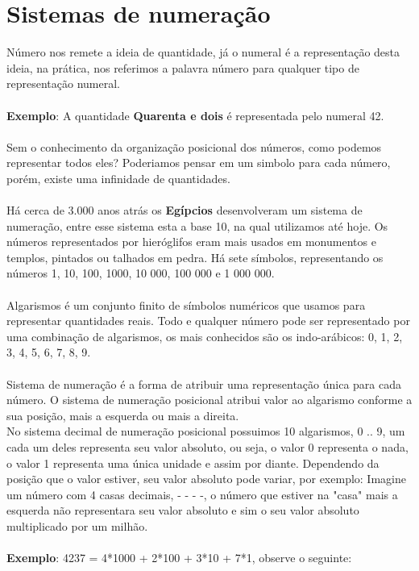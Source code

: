 \documentclass[12pt, onecolumn]{article}
\begin{document}
	\section{Sistemas de numeração}
	Número nos remete a ideia de quantidade, já o numeral é a representação desta 
	ideia, na prática, nos referimos a palavra número para qualquer tipo de
	representação numeral.\\
	\\
	\textbf{Exemplo}: A quantidade \textbf{Quarenta e dois} é representada pelo
	numeral 42.\\
	\\
	Sem o conhecimento da organização posicional dos números, como podemos
	representar todos eles? Poderiamos pensar em um simbolo para cada número,
	porém, existe uma infinidade de quantidades.\\
	\\
	Há cerca de 3.000 anos atrás os \textbf{Egípcios} desenvolveram um sistema
	de numeração, entre esse sistema esta a base 10, na qual utilizamos até hoje.
	Os números representados por hieróglifos eram mais usados em monumentos e 
	templos, pintados ou talhados em pedra. 
	Há sete símbolos, representando os números 1, 10, 100, 1000, 10 000, 
	100 000 e 1 000 000.\citep{art3}\\
	\\
	Algarismos é um conjunto finito de símbolos numéricos que usamos para
	representar quantidades reais. Todo e qualquer número pode ser representado
	por uma combinação de algarismos, os mais conhecidos são os indo-arábicos:
	0, 1, 2, 3, 4, 5, 6, 7, 8, 9.\\
	\\
	Sistema de numeração é a forma de atribuir uma representação única para cada
	número. O sistema de numeração posicional atribui valor ao algarismo conforme
	a sua posição, mais a esquerda ou mais a direita.
	\\
	No sistema decimal de numeração posicional possuimos 10 algarismos, 0 .. 9,
	um cada um deles representa seu valor absoluto, ou seja, o valor 0 representa
	o nada, o valor 1 representa uma única unidade e assim por diante. Dependendo
	da posição que o valor estiver, seu valor absoluto pode variar, por exemplo:
	Imagine um número com 4 casas decimais, - - - -, o número que estiver na 
	"casa" mais a esquerda não representara seu valor absoluto e sim o seu valor
	absoluto multiplicado por um milhão.\\
	\\
	\textbf{Exemplo}: 4237 = 4*1000 + 2*100 + 3*10 + 7*1, observe o seguinte:\\
\end{document}
